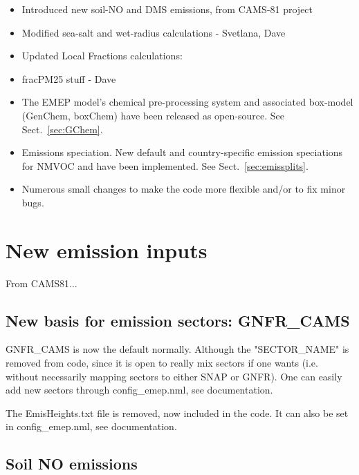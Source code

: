 \begin{itemize}

\item Introduced new soil-NO and DMS emissions, from CAMS-81 project 

\item Modified sea-salt and wet-radius calculations - Svetlana, Dave

\item
Updated Local Fractions calculations: 

\item  fracPM25 stuff - Dave

\item
The EMEP model's chemical pre-processing system and associated
box-model (GenChem, boxChem) have been released as open-source.
See Sect.~\ref{sec:GChem}.

\item
Emissions speciation. New default and country-specific emission
speciations for NMVOC and \pmfine have been implemented.  See
Sect.~\ref{sec:emissplits}.

\item
Numerous small changes to make the code more flexible and/or to
fix minor bugs.

\end{itemize}

\section{New emission inputs}
\label{sec:updateEmis}

From CAMS81...

\subsection{New basis for emission sectors: GNFR\_CAMS}
\label{ssec:gnfr}

GNFR_CAMS is now the default normally. Although the "SECTOR_NAME" is removed
from code, since it is open to really mix sectors if one wants (i.e. without
necessarily mapping sectors to either SNAP or GNFR).
One can easily add new sectors through config_emep.nml, see documentation.

The EmisHeights.txt file is removed, now included in the code. It can also be
set in config_emep.nml, see documentation.


\subsection{Soil NO emissions}
\label{ssec:soilNO}

